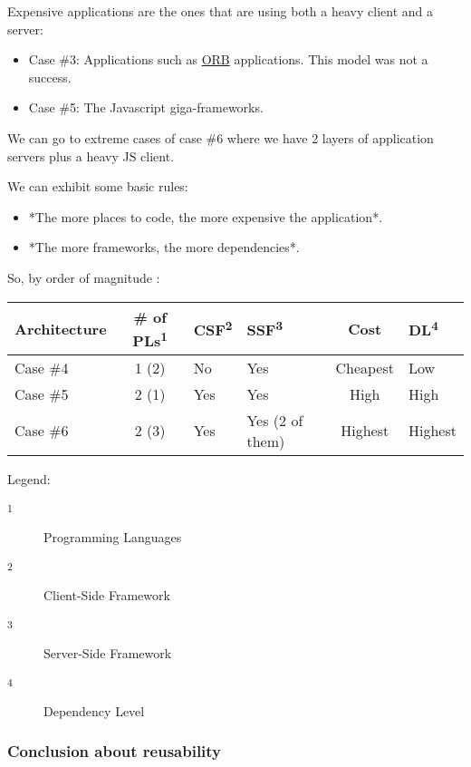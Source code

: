 \documentclass[]{article}
\begin{document}
Expensive applications are the ones that are using both a heavy client and a server:

\begin{itemize}
\item Case \#3: Applications such as \href{https://en.wikipedia.org/wiki/Object_request_broker}{ORB} applications. This model was not a success.
\item Case \#5: The Javascript giga-frameworks.
\end{itemize}

We can go to extreme cases of case \#6 where we have 2 layers of application servers plus a heavy JS client.

We can exhibit some basic rules:

\begin{itemize}
\item *The more places to code, the more expensive the application*.
\item *The more frameworks, the more dependencies*.
\end{itemize}

So, by order of magnitude :

\begin{tabular}{|l|c|l|l|c|l|}
\textbf{Architecture} & \textbf{\# of PLs\textsuperscript{1}} & \textbf{CSF\textsuperscript{2}} & \textbf{SSF\textsuperscript{3}} & \textbf{Cost} & \textbf{DL\textsuperscript{4}} \\
\hline
Case \#4 & 1 (2) & No  & Yes             & Cheapest & Low\\
Case \#5 & 2 (1) & Yes & Yes             & High     & High\\
Case \#6 & 2 (3) & Yes & Yes (2 of them) & Highest  & Highest\\
\end{tabular}

Legend:
\begin{description}
\item[\textsuperscript{1}] Programming Languages
\item[\textsuperscript{2}] Client-Side Framework
\item[\textsuperscript{3}] Server-Side Framework
\item[\textsuperscript{4}] Dependency Level
\end{description}

\subsubsection{Conclusion about reusability}
\end{document}
